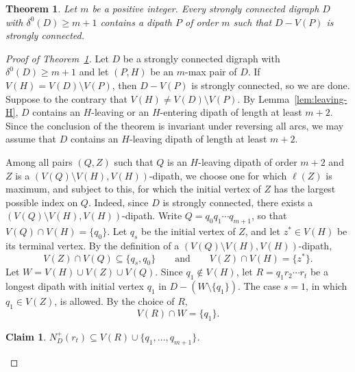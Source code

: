 \documentclass[10pt,a4paper]{amsart}
\newtheorem{theorem}{Theorem}
\newtheorem{claim}{Claim}
\begin{document}
\begin{theorem}\label{thm:main}
Let $m$ be a positive integer.
Every strongly connected digraph $D$ with $\delta^0(D)\ge m+1$ contains a dipath $P$ of order $m$ such that $D-V(P)$ is strongly connected.
\end{theorem}

\begin{proof}[Proof of Theorem~\ref{thm:main}]
Let $D$ be a strongly connected digraph with $\delta^0(D)\ge m+1$ and let $(P,H)$ be an $m$-max pair of $D$.
If $V(H)=V(D)\setminus V(P)$, then $D-V(P)$ is strongly connected, so we are done.
Suppose to the contrary that $V(H)\ne V(D)\setminus V(P)$.
By Lemma~\ref{lem:leaving-H}, $D$ contains an $H$-leaving or an $H$-entering dipath of length at least $m+2$.
Since the conclusion of the theorem is invariant under reversing all arcs, we may assume that $D$ contains an $H$-leaving dipath of length at least $m+2$.

Among all pairs $(Q,Z)$ such that $Q$ is an $H$-leaving dipath of order $m+2$ and $Z$ is a $(V(Q)\setminus V(H),V(H))$-dipath, we choose one for which $\ell(Z)$ is maximum, and subject to this, for which the initial vertex of $Z$ has the largest possible index on $Q$.
Indeed, since $D$ is strongly connected, there exists a $(V(Q)\setminus V(H),V(H))$-dipath.
Write $Q=q_0q_1\cdots q_{m+1}$, so that $V(Q)\cap V(H)=\{q_0\}$.
Let $q_s$ be the initial vertex of $Z$, and let $z^*\in V(H)$ be its terminal vertex.
By the definition of a $(V(Q)\setminus V(H),V(H))$-dipath,
\begin{equation}\label{eq:Z-meets}
V(Z)\cap V(Q)\subseteq\{q_s,q_0\}
\qquad\text{and}\qquad
V(Z)\cap V(H)=\{z^*\}.
\end{equation}
Let $W=V(H)\cup V(Z)\cup V(Q)$.
Since $q_1\notin V(H)$, let $R=q_1r_2\cdots r_t$ be a longest dipath with initial vertex $q_1$ in $D-(W\setminus\{q_1\})$.
The case $s=1$, in which $q_1\in V(Z)$, is allowed.
By the choice of $R$,
\begin{equation}\label{eq:R-meets}
V(R)\cap W=\{q_1\}.
\end{equation}

\begin{claim}\label{clm:containment}
$N_D^+(r_t)\subseteq V(R)\cup\{q_1,\ldots,q_{m+1}\}$.
\end{claim}


\end{proof}
\end{document}

